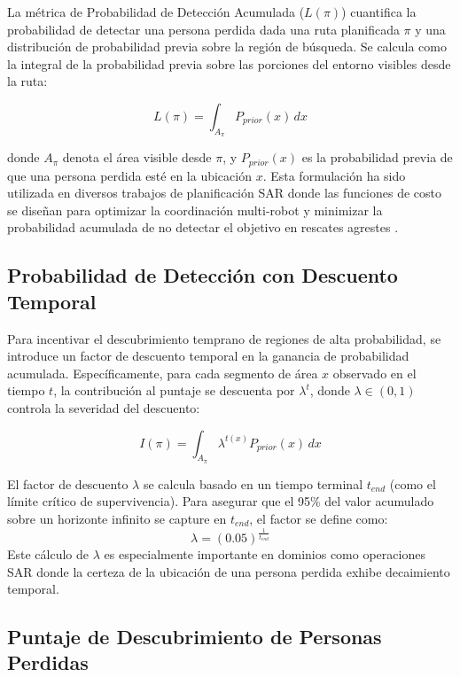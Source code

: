 La métrica de Probabilidad de Detección Acumulada ($L(\pi)$) cuantifica la probabilidad de detectar una persona perdida dada una ruta planificada $\pi$ y una distribución de probabilidad previa sobre la región de búsqueda. Se calcula como la integral de la probabilidad previa sobre las porciones del entorno visibles desde la ruta:

\begin{equation}
L(\pi) = \int_{A_\pi} P_{prior}(x) \, dx
\end{equation}

donde $A_\pi$ denota el área visible desde $\pi$, y $P_{prior}(x)$ es la probabilidad previa de que una persona perdida esté en la ubicación $x$. Esta formulación ha sido utilizada en diversos trabajos de planificación SAR donde las funciones de costo se diseñan para optimizar la coordinación multi-robot y minimizar la probabilidad acumulada de no detectar el objetivo en rescates agrestes \cite{li2020}.

\subsection{Probabilidad de Detección con Descuento Temporal}

Para incentivar el descubrimiento temprano de regiones de alta probabilidad, se introduce un factor de descuento temporal en la ganancia de probabilidad acumulada. Específicamente, para cada segmento de área $x$ observado en el tiempo $t$, la contribución al puntaje se descuenta por $\lambda^t$, donde $\lambda \in (0,1)$ controla la severidad del descuento:

\begin{equation}
I(\pi) = \int_{A_\pi} \lambda^{t(x)} P_{prior}(x) \, dx
\end{equation}

El factor de descuento $\lambda$ se calcula basado en un tiempo terminal $t_{end}$ (como el límite crítico de supervivencia). Para asegurar que el 95\% del valor acumulado sobre un horizonte infinito se capture en $t_{end}$, el factor se define como:
\begin{equation}
\lambda = (0.05)^{\frac{1}{t_{end}}}
\end{equation}
Este cálculo de $\lambda$ es especialmente importante en dominios como operaciones SAR donde la certeza de la ubicación de una persona perdida exhibe decaimiento temporal.

\subsection{Puntaje de Descubrimiento de Personas Perdidas}

